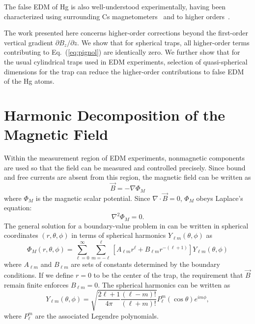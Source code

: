 \documentclass[preprint,12pt]{elsarticle}
\begin{document}
The false EDM of Hg is also well-understood experimentally, having
been characterized using surrounding Cs magnetometers~\cite{bib:hgcs}
and to higher orders~\cite{bib:komposch}.

The work presented here concerns higher-order corrections beyond the
first-order vertical gradient $\partial B_{z}/\partial z$.  We show
that for spherical traps, all higher-order terms contributing to
Eq.~(\ref{eq:pignol}) are identically zero.  We further show that for
the usual cylindrical traps used in EDM experiments, selection of
quasi-spherical dimensions for the trap can reduce the higher-order
contributions to false EDM of the Hg atoms.


\section{Harmonic Decomposition of the Magnetic Field}

Within the measurement region of EDM experiments, nonmagnetic
components are used so that the field can be measured and controlled
precisely.  Since bound and free currents are absent from this region,
the magnetic field can be written as
\begin{equation}
\vec{B}=-\nabla\Phi_M
\end{equation}
where $\Phi_M$ is the magnetic scalar potential.  Since
$\nabla\cdot\vec{B}=0$, $\Phi_M$ obeys Laplace's equation:
\begin{equation}
\nabla^2\Phi_M=0.
\end{equation}
The general solution for a boundary-value problem in can be written in
spherical coordinates $(r,\theta,\phi)$ in terms of spherical
harmonics $Y_{\ell m}(\theta,\phi)$ as~\cite{bib:jackson}
\begin{equation}\label{eq:boundaryvalue}
  \Phi_M(r,\theta,\phi)=\sum_{\ell=0}^\infty\sum_{m=-\ell}^\ell\left[A_{\ell m}r^\ell+B_{\ell m}r^{-(\ell+1)}\right]Y_{\ell m}(\theta,\phi)
\end{equation}
where $A_{\ell m}$ and $B_{\ell m}$ are sets of constants determined
by the boundary conditions.  If we define $r=0$ to be the center of
the trap, the requirement that $\vec{B}$ remain finite enforces
$B_{\ell m}=0$.  The spherical harmonics can be written as
\begin{equation}
    Y_{\ell m}(\theta,\phi)=\sqrt{\frac{2\ell+1}{4\pi}\frac{(\ell-m)!}{(\ell+m)!}}P_{\ell}^{m}(\cos\theta)e^{im\phi},
\end{equation}
where $P_{\ell}^{m}$ are the associated Legendre polynomials.  
\end{document}

